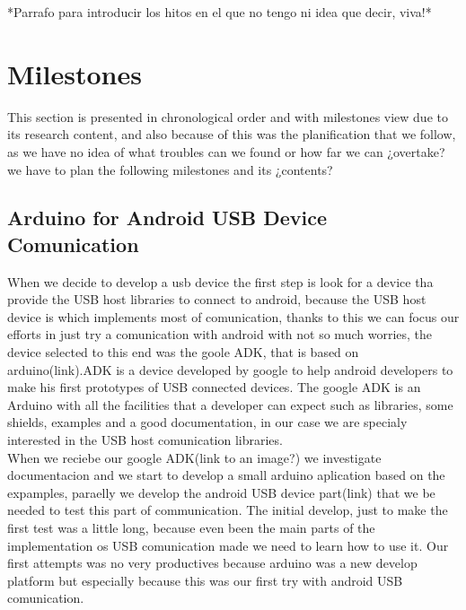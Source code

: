 	*Parrafo para introducir los hitos en el que no tengo ni idea que decir, viva!*	
	
	\section{Milestones}	
	This section is presented in chronological order and with milestones view due to its research content, and also because of this was the planification that we follow, as we have no idea of what troubles can we found or how far we can ¿overtake? we have to plan the following milestones and its ¿contents?%



		\subsection{Arduino for Android USB Device Comunication}
		When we decide to develop a usb device the first step is look for a device tha provide the USB host libraries to connect to android, because the USB host device is which implements most of comunication, thanks to this we can focus our efforts in just try a comunication with android with not so much worries, the device selected to this end was the goole ADK, that is based on arduino(link).ADK is a device developed by google to help android developers to make his first prototypes of USB connected devices. The google ADK is an Arduino with all the facilities that a developer can expect such as libraries, some shields, examples and a good documentation, in our case we are specialy interested in the USB host comunication libraries.\\

		
		 When we reciebe our google ADK(link to an image?) we investigate documentacion and we start to develop a small arduino aplication based on the expamples, paraelly we develop the android USB device part(link) that we be needed to test this part of  communication. The initial develop, just to make the first test was a little long, because even been the main parts of the implementation os USB comunication made we need to learn how to use it. Our first attempts was no very productives because arduino was a new develop platform but especially because this was our first try with android USB comunication. \\

